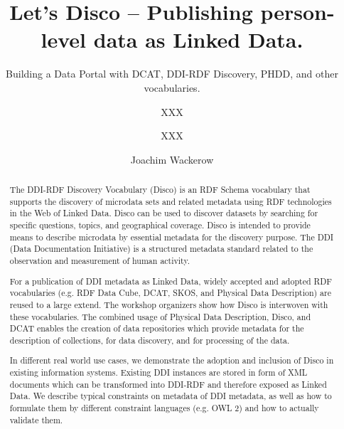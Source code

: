 \documentclass{llncs}
\newcommand{\bz}[1]{\todo[size=\small, color=orange!40]{\textbf{Ben:} #1}}
\begin{document}
%
%
\title{Let’s Disco – Publishing person-level data as Linked Data.}
\subtitle{Building a Data Portal with DCAT, DDI-RDF Discovery, PHDD, and other vocabularies.\bz{Ben's Kommentar}
}
%
%
\author{XXX \and XXX \and Joachim Wackerow}
%
%

\maketitle              %

\begin{abstract}
The DDI-RDF Discovery Vocabulary (Disco) is an RDF Schema vocabulary that supports the discovery of microdata sets and related metadata using RDF technologies in the Web of Linked Data. Disco can be used to discover datasets by searching for specific questions, topics, and geographical coverage. Disco is intended to provide means to describe microdata by essential metadata for the discovery purpose.
 The DDI (Data Documentation Initiative) is a structured metadata standard related to the observation and measurement of human activity.

For a publication of DDI metadata as Linked Data, widely accepted and adopted RDF vocabularies (e.g. RDF Data Cube, DCAT, SKOS, and Physical Data Description) are reused to a large extend. 
The workshop organizers show how Disco is interwoven with these vocabularies. 
The combined usage of Physical Data Description, Disco, and DCAT enables the creation of data repositories which provide metadata for the description of collections, for data discovery, and for processing of the data.
 
In different real world use cases, we demonstrate the adoption and inclusion of Disco in existing information systems. 
Existing DDI instances are stored in form of XML documents which can be transformed into DDI-RDF and therefore exposed as Linked Data.
We describe typical constraints on metadata of DDI metadata, as well as how to formulate them by different constraint languages (e.g. OWL 2) and how to actually validate them.

\end{abstract}
%
\end{document}
